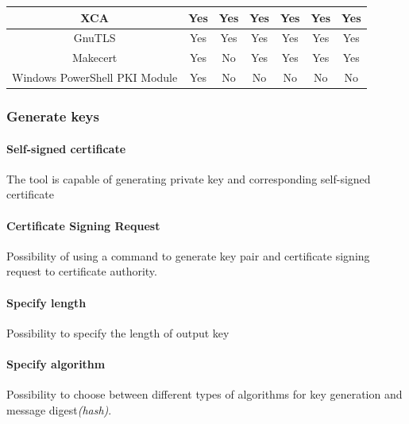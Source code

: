 \documentclass[10pt, a4paper]{report}
\begin{document}
\begin{table}[h!]
\begin{adjustbox}{max width=\textwidth}
\begin{tabular}{|c|c|c|c|c|c|c|}
XCA                           & \cellcolor[HTML]{34FF34}Yes                                          & \cellcolor[HTML]{34FF34}Yes & \cellcolor[HTML]{34FF34}Yes & \cellcolor[HTML]{34FF34}Yes & \cellcolor[HTML]{34FF34}Yes & \cellcolor[HTML]{34FF34}Yes \\ \hline
GnuTLS                        & \cellcolor[HTML]{34FF34}Yes                                          & \cellcolor[HTML]{34FF34}Yes & \cellcolor[HTML]{34FF34}Yes & \cellcolor[HTML]{34FF34}Yes & \cellcolor[HTML]{34FF34}Yes & \cellcolor[HTML]{34FF34}Yes \\ \hline
Makecert                      & \cellcolor[HTML]{34FF34}Yes					     & \cellcolor[HTML]{FE0000}No  & \cellcolor[HTML]{34FF34}Yes & \cellcolor[HTML]{FFC702}Yes & \cellcolor[HTML]{34FF34}Yes & \cellcolor[HTML]{34FF34}Yes \\ \hline
Windows PowerShell PKI Module & \cellcolor[HTML]{34FF34}Yes                                          & \cellcolor[HTML]{FE0000}No  & \cellcolor[HTML]{FE0000}No  & \cellcolor[HTML]{FE0000}No  & \cellcolor[HTML]{FE0000}No  & \cellcolor[HTML]{FE0000}No  \\ \hline
\end{tabular}
\end{adjustbox}
\end{table}

\subsubsection{Generate keys}

\paragraph{Self-signed certificate}
The tool is capable of generating private key and corresponding self-signed certificate

\paragraph{Certificate Signing Request}
Possibility of using a command to generate key pair and certificate signing request to certificate authority.

\paragraph{Specify length}
Possibility to specify the length of output key

\paragraph{Specify algorithm}
Possibility to choose between different types of algorithms for key generation and message digest\textit{(hash)}.
\end{document}
